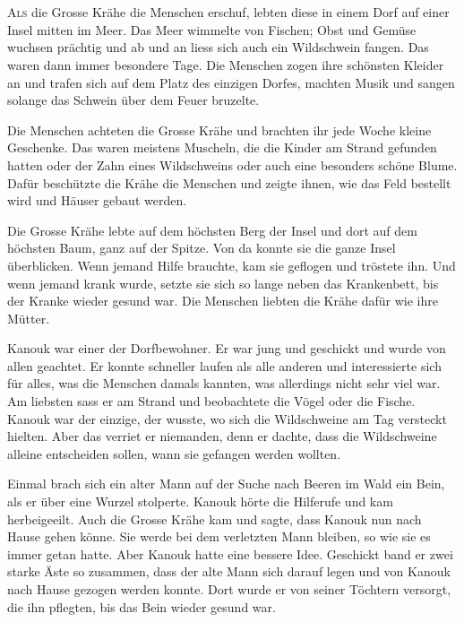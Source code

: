 \chapter*{}
\lettrine[lines=3]{\color{DeepPink}A}{ls} die Grosse Krähe die Menschen erschuf, lebten diese in einem Dorf auf einer Insel mitten im Meer. Das Meer wimmelte von Fischen; Obst und Gemüse wuchsen prächtig und ab und an liess sich auch ein Wildschwein fangen. Das waren dann immer besondere Tage. Die Menschen zogen ihre schönsten Kleider an und trafen sich auf dem Platz des einzigen Dorfes, machten Musik und sangen solange das Schwein über dem Feuer bruzelte.

Die Menschen achteten die Grosse Krähe und brachten ihr jede Woche kleine Geschenke. Das waren meistens Muscheln, die die Kinder am Strand gefunden hatten oder der Zahn eines Wildschweins oder auch eine besonders schöne Blume. Dafür beschützte die Krähe die Menschen und zeigte ihnen, wie das Feld bestellt wird und Häuser gebaut werden.

Die Grosse Krähe lebte auf dem höchsten Berg der Insel und dort auf dem höchsten Baum, ganz auf der Spitze. Von da konnte sie die ganze Insel überblicken. Wenn jemand Hilfe brauchte, kam sie geflogen und tröstete ihn. Und wenn jemand krank wurde, setzte sie sich so lange neben das Krankenbett, bis der Kranke wieder gesund war. Die Menschen liebten die Krähe dafür wie ihre Mütter.

Kanouk war einer der Dorfbewohner. Er war jung und geschickt und wurde von allen geachtet. Er konnte schneller laufen als alle anderen und interessierte sich für alles, was die Menschen damals kannten, was allerdings nicht sehr viel war. Am liebsten sass er am Strand und beobachtete die Vögel oder die Fische. Kanouk war der einzige, der wusste, wo sich die Wildschweine am Tag versteckt hielten. Aber das verriet er niemanden, denn er dachte, dass die Wildschweine alleine entscheiden sollen, wann sie gefangen werden wollten.

Einmal brach sich ein alter Mann auf der Suche nach Beeren im Wald ein Bein, als er über eine Wurzel stolperte. Kanouk hörte die Hilferufe und kam herbeigeeilt. Auch die Grosse Krähe kam und sagte, dass Kanouk nun nach Hause gehen könne. Sie werde bei dem verletzten Mann bleiben, so wie sie es immer getan hatte. Aber Kanouk hatte eine bessere Idee. Geschickt band er zwei starke Äste so zusammen, dass der alte Mann sich darauf legen und von Kanouk nach Hause gezogen werden konnte. Dort wurde er von seiner Töchtern versorgt, die ihn pflegten, bis das Bein wieder gesund war.

